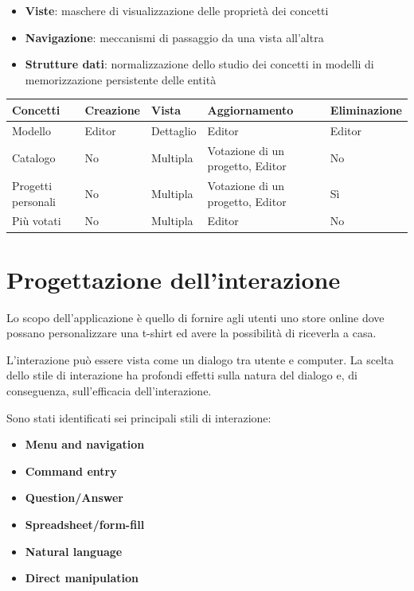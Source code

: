 \documentclass[12pt,italian,]{report}
\providecommand{\tightlist}{%
  \setlength{\itemsep}{0pt}\setlength{\parskip}{0pt}}
\begin{document}
\begin{itemize}
\tightlist
\item
  \textbf{Viste}: maschere di visualizzazione delle proprietà dei
  concetti
\item
  \textbf{Navigazione}: meccanismi di passaggio da una vista all'altra
\item
  \textbf{Strutture dati}: normalizzazione dello studio dei concetti in
  modelli di memorizzazione persistente delle entità
\end{itemize}

\begin{longtable}[]{|l|l|l|l|l|}
\toprule
Concetti & Creazione & Vista & Aggiornamento &
Eliminazione\tabularnewline
\midrule
\endhead
Modello & Editor & Dettaglio & Editor & Editor\tabularnewline
Catalogo & No & Multipla & Votazione di un progetto, Editor & No\tabularnewline
Progetti personali & No & Multipla & Votazione di un progetto, Editor & Sì\tabularnewline
Più votati & No & Multipla & Editor & No\tabularnewline
\bottomrule
\end{longtable}

\hypertarget{progettazione-dellinterazione}{%
\section{Progettazione
dell'interazione}\label{progettazione-dellinterazione}}

Lo scopo dell'applicazione è quello di fornire agli utenti uno store
online dove possano personalizzare una t-shirt ed avere la possibilità
di riceverla a casa.

L'interazione può essere vista come un dialogo tra utente e computer. La
scelta dello stile di interazione ha profondi effetti sulla natura del
dialogo e, di conseguenza, sull'efficacia dell'interazione.

Sono stati identificati sei principali stili di interazione:

\begin{itemize}
\tightlist
\item
  \textbf{Menu and navigation}
\item
  \textbf{Command entry}
\item
  \textbf{Question/Answer}
\item
  \textbf{Spreadsheet/form-fill}
\item
  \textbf{Natural language}
\item
  \textbf{Direct manipulation}
\end{itemize}
\end{document}

